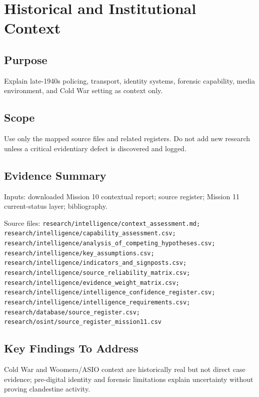 
\chapter{Historical and Institutional Context}
\label{chap:09-historical-context}


\section{Purpose}
Explain late-1940s policing, transport, identity systems, forensic capability, media environment, and Cold War setting as context only.

\section{Scope}
Use only the mapped source files and related registers. Do not add new research unless a critical evidentiary defect is discovered and logged.

\section{Evidence Summary}
Inputs: downloaded Mission 10 contextual report; source register; Mission 11 current-status layer; bibliography.

Source files: \texttt{research/intelligence/context_assessment.md; research/intelligence/capability_assessment.csv; research/intelligence/analysis_of_competing_hypotheses.csv; research/intelligence/key_assumptions.csv; research/intelligence/indicators_and_signposts.csv; research/intelligence/source_reliability_matrix.csv; research/intelligence/evidence_weight_matrix.csv; research/intelligence/intelligence_confidence_register.csv; research/intelligence/intelligence_requirements.csv; research/database/source_register.csv; research/osint/source_register_mission11.csv}

\section{Key Findings To Address}
Cold War and Woomera/ASIO context are historically real but not direct case evidence; pre-digital identity and forensic limitations explain uncertainty without proving clandestine activity.

